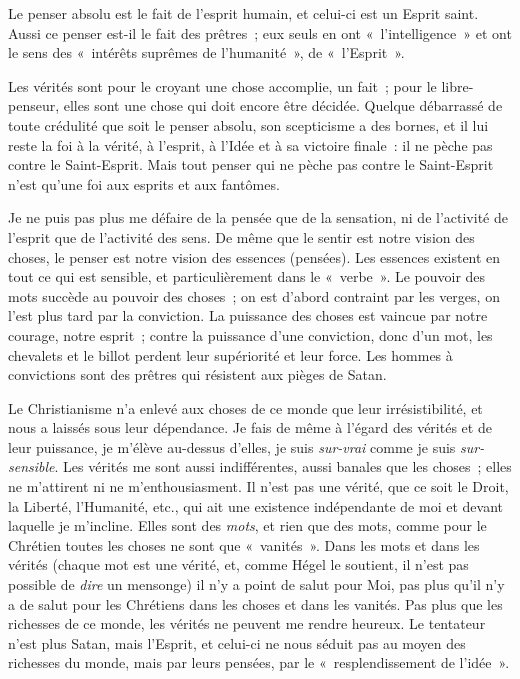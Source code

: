 \documentclass[french,twoside]{book} %
\begin{document}
Le penser absolu est le fait de l’esprit humain, et celui-ci est un Esprit saint. Aussi ce penser est-il le fait des prêtres ; eux seuls en ont « l’intelligence » et ont le sens des « intérêts suprêmes de l’humanité », de « l’Esprit ».\par
Les vérités sont pour le croyant une chose accomplie, un fait ; pour le libre-penseur, elles sont une chose qui doit encore être décidée. Quelque débarrassé de toute crédulité que soit le penser absolu, son scepticisme a des bornes, et il lui reste la foi à la vérité, à l’esprit, à l’Idée et à sa victoire finale : il ne pèche pas contre le Saint-Esprit. Mais tout penser qui ne pèche pas contre le Saint-Esprit n’est qu’une foi aux esprits et aux fantômes.\par
Je ne puis pas plus me défaire de la pensée que de la sensation, ni de l’activité de l’esprit que de l’activité  des sens. De même que le sentir est notre vision des choses, le penser est notre vision des essences (pensées). Les essences existent en tout ce qui est sensible, et particulièrement dans le « verbe ». Le pouvoir des mots succède au pouvoir des choses ; on est d’abord contraint par les verges, on l’est plus tard par la conviction. La puissance des choses est vaincue par notre courage, notre esprit ; contre la puissance d’une conviction, donc d’un mot, les chevalets et le billot perdent leur supériorité et leur force. Les hommes à convictions sont des prêtres qui résistent aux pièges de Satan.\par
Le Christianisme n’a enlevé aux choses de ce monde que leur irrésistibilité, et nous a laissés sous leur dépendance. Je fais de même à l’égard des vérités et de leur puissance, je m’élève au-dessus d’elles, je suis \emph{sur-vrai} comme je suis \emph{sur-sensible}. Les vérités me sont aussi indifférentes, aussi banales que les choses ; elles ne m’attirent ni ne m’enthousiasment. Il n’est pas une vérité, que ce soit le Droit, la Liberté, l’Humanité, etc., qui ait une existence indépendante de moi et devant laquelle je m’incline. Elles sont des \emph{mots}, et rien que des mots, comme pour le Chrétien toutes les choses ne sont que « vanités ». Dans les mots et dans les vérités (chaque mot est une vérité, et, comme Hégel le soutient, il n’est pas possible de \emph{dire} un mensonge) il n’y a point de salut pour Moi, pas plus qu’il n’y a de salut pour les Chrétiens dans les choses et dans les vanités. Pas plus que les richesses de ce monde, les vérités ne peuvent me rendre heureux. Le tentateur n’est plus Satan, mais l’Esprit, et celui-ci ne nous séduit pas au moyen des richesses du monde, mais par leurs pensées, par le « resplendissement de l’idée ».\par
\end{document}
